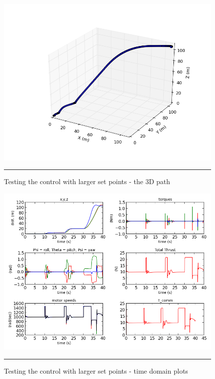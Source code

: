 \begin{figure}[htbp]
	\centering
		\includegraphics[width=\textwidth]{Figures/largeSetpointDifferencesTest_3d.png}
		\rule{35em}{0.5pt}
	\caption[Large Set Points 3D Path]{Testing the control with larger set points - the 3D path}
	\label{fig:Large Setpoints 3D Path}
\end{figure}

\begin{figure}[htbp]
	\centering
		\includegraphics[width=\textwidth]{Figures/largeSetpointDifferencesTest_timedomain.png}
		\rule{35em}{0.5pt}
	\caption[Large Set Point Time Domain]{Testing the control with larger set points - time domain plots }
	\label{fig:Large Setpoint Time Domain}
\end{figure}





